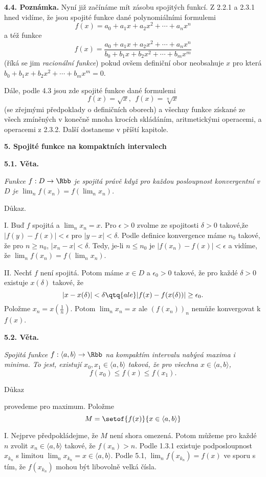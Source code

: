 \documentclass[12pt]{article}
\begin{document}
{ \bigskip
 
 {\bf 4.4. Poznámka.} Nyní již začínáme mít zásobu spojitých funkcí. Z 2.2.1 a 2.3.1 hned vidíme, že jsou spojité funkce dané polynomiálními formulemi
 $$
 f(x)=a_0+a_1x+a_2x^2+\cdots+a_nx^n
 $$
 a též funkce
  $$
  f(x)=\frac{a_0+a_1x+a_2x^2+\cdots+a_nx^n}{b_0+b_1x+b_2x^2+\cdots+b_mx^m}
  $$
  (říká se jim {\em racionální funkce})
  pokud ovšem definiční obor neobsahuje $x$ pro která
  $b_0+b_1x+b_2x^2+\cdots+b_mx^m=0$.
  
Dále, podle 4.3 jsou zde spojité funkce dané formulemi
  $$
  f(x)=\sqrt{x},\ \  f(x)=\sqrt[n]{x}
  $$
(se zřejmými předpoklady o definičních oborech) a všechny funkce získané ze všech zmíněných v konečně mnoha krocích skládáním, aritmetickými operacemi, a operacemi z 2.3.2. Další dostaneme v příští kapitole.

\vskip10mm
 
 {\large\bf 5. Spojité funkce na kompaktních intervalech}
 
 \bigskip
 
 {\bf 5.1. Věta.} {\em Funkce $f:D\to\Rbb$ je spojitá právě když pro každou posloupnost konvergentní v $D$ je $\lim_nf(x_n)=f(\lim_nx_n)$.
 
 Důkaz.} I. Buď $f$ spojitá a $\lim_nx_n=x$. Pro $\epsilon>0$ zvolme ze spojitosti $\delta>0$ takové,že $|f(y)-f(x)|<\epsilon$ pro $|y-x|<\delta$. Podle definice konvergence máme $n_0$ takové, že pro $n\geq n_0$, $|x_n-x|<\delta.$ Tedy, je-li $n\leq n_0$ je $|f(x_n)-f(x)|<\epsilon$ a vidíme, že
  $\lim_nf(x_n)=f(\lim_nx_n)$.
  
  \smallskip
  
  II. Nechť $f$ není spojitá. Potom máme $x\in D$ a $\epsilon_0>0$
 takové, že pro každé  $\delta>0$ existuje $x(\delta)$ takové, že 
  $$
  |x-x(\delta)|<\delta \qtq{ale} |f(x)-f(x(\delta))|\geq \epsilon_0.
  $$
  Položme $x_n=x(\frac1n)$. Potom $\lim_nx_n=x$ ale $(f(x_n))_n$ nemůže konvergovat k $f(x)$. \sq
 
 \bigskip
 
 {\bf 5.2. Věta.} {\em Spojitá funkce $f:\langle a,b\rangle\to \Rbb$ na kompaktím intervalu nabývá maxima i minima.
 To jest, existují $x_0,x_1\in\langle a,b\rangle$ taková, že pro všechna $x\in\langle a,b\rangle$,
 $$
 f(x_0) \leq f(x)\leq f(x_1).
 $$
 
 Důkaz} provedeme pro maximum. Položme
 $$
 M=\setof{f(x)}{x\in\langle a,b\rangle}
 $$
 
 I. Nejprve předpokládejme, že $M$ není shora omezená. Potom můžeme pro každé $n$ zvolit $x_n\in\langle a,b\rangle$ takové, že $f(x_n)>n$.  Podle 1.3.1 existuje podposloupnost $x_{k_n}$ s limitou $\lim_nx_{k_n}=x\in\langle a,b\rangle$. Podle 5.1, $\lim_nf(x_{k_n})=f(x)$ ve sporu s tím, že $f(x_{k_n})$ mohou být libovolně velká čísla.
 
}
\end{document}
